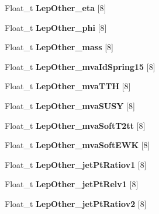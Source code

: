 \begin{DoxyCompactItemize}
\hypertarget{classMiniTree_a0dd0f7b3a2f3ee58ce8c4846afd9bf90}{}\label{classMiniTree_a0dd0f7b3a2f3ee58ce8c4846afd9bf90} 
Float\+\_\+t {\bfseries Lep\+Other\+\_\+eta} \mbox{[}8\mbox{]}
\item 
\hypertarget{classMiniTree_a25f00b07b7ce6a539091199a325e0478}{}\label{classMiniTree_a25f00b07b7ce6a539091199a325e0478} 
Float\+\_\+t {\bfseries Lep\+Other\+\_\+phi} \mbox{[}8\mbox{]}
\item 
\hypertarget{classMiniTree_a9928de768cf69a6a6aeb4020d77563dc}{}\label{classMiniTree_a9928de768cf69a6a6aeb4020d77563dc} 
Float\+\_\+t {\bfseries Lep\+Other\+\_\+mass} \mbox{[}8\mbox{]}
\item 
\hypertarget{classMiniTree_af4d71d9c0ee3a218b5a1cfe2b6e1a615}{}\label{classMiniTree_af4d71d9c0ee3a218b5a1cfe2b6e1a615} 
Float\+\_\+t {\bfseries Lep\+Other\+\_\+mva\+Id\+Spring15} \mbox{[}8\mbox{]}
\item 
\hypertarget{classMiniTree_aab8625fa9dbda2af419741afcb88590b}{}\label{classMiniTree_aab8625fa9dbda2af419741afcb88590b} 
Float\+\_\+t {\bfseries Lep\+Other\+\_\+mva\+T\+TH} \mbox{[}8\mbox{]}
\item 
\hypertarget{classMiniTree_ad2dbd67a3bc2779bbd35c28767c6a580}{}\label{classMiniTree_ad2dbd67a3bc2779bbd35c28767c6a580} 
Float\+\_\+t {\bfseries Lep\+Other\+\_\+mva\+S\+U\+SY} \mbox{[}8\mbox{]}
\item 
\hypertarget{classMiniTree_a9329184894b8d32595e280feb74ba03c}{}\label{classMiniTree_a9329184894b8d32595e280feb74ba03c} 
Float\+\_\+t {\bfseries Lep\+Other\+\_\+mva\+Soft\+T2tt} \mbox{[}8\mbox{]}
\item 
\hypertarget{classMiniTree_a3d174da26a744f3e7dcec8ccdd45fcf6}{}\label{classMiniTree_a3d174da26a744f3e7dcec8ccdd45fcf6} 
Float\+\_\+t {\bfseries Lep\+Other\+\_\+mva\+Soft\+E\+WK} \mbox{[}8\mbox{]}
\item 
\hypertarget{classMiniTree_af3c2c8b99d61c22201ff00bd22fd11d8}{}\label{classMiniTree_af3c2c8b99d61c22201ff00bd22fd11d8} 
Float\+\_\+t {\bfseries Lep\+Other\+\_\+jet\+Pt\+Ratiov1} \mbox{[}8\mbox{]}
\item 
\hypertarget{classMiniTree_a3e79a547ebdb6ab3fdc4906086cc588e}{}\label{classMiniTree_a3e79a547ebdb6ab3fdc4906086cc588e} 
Float\+\_\+t {\bfseries Lep\+Other\+\_\+jet\+Pt\+Relv1} \mbox{[}8\mbox{]}
\item 
\hypertarget{classMiniTree_a55bc2aa9d77efc1e876529f6b184c068}{}\label{classMiniTree_a55bc2aa9d77efc1e876529f6b184c068} 
Float\+\_\+t {\bfseries Lep\+Other\+\_\+jet\+Pt\+Ratiov2} \mbox{[}8\mbox{]}
\item 

\end{DoxyCompactItemize}
